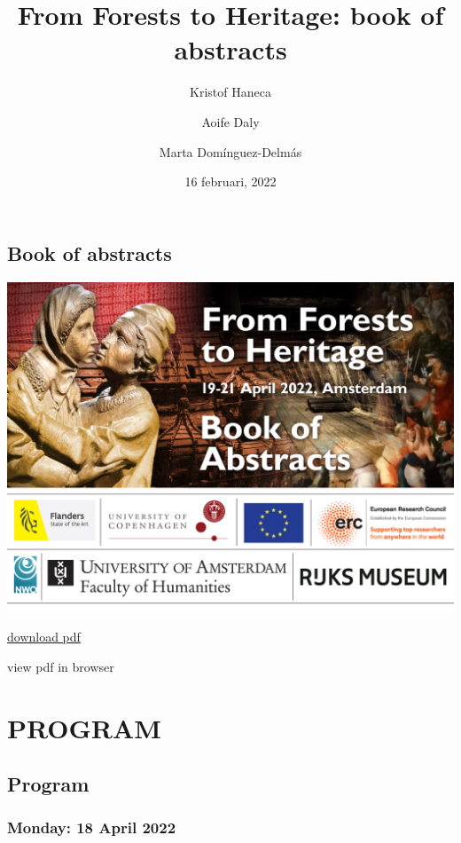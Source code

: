\documentclass[
]{book}
\title{From Forests to Heritage: book of abstracts}
\author{Kristof Haneca \and Aoife Daly \and Marta Domínguez-Delmás}
\date{16 februari, 2022}
\begin{document}
\maketitle

{
\setcounter{tocdepth}{1}
\tableofcontents
}
\hypertarget{book-of-abstracts}{%
\chapter*{Book of abstracts}\label{book-of-abstracts}}

\href{https://event.forests2heritage.nl/}{\includegraphics[width=1\textwidth,height=\textheight]{bookofAbstracts header.jpg}}

\href{https://github.com/hanecakr/forests2heritage/raw/main/docs/ForHer22_BOOKofABSTRACTS.pdf}{download pdf}

view pdf in browser

\hypertarget{part-program}{%
\part*{PROGRAM}\label{part-program}}

\hypertarget{program}{%
\chapter*{Program}\label{program}}

\hypertarget{monday-18-april-2022}{%
\section*{Monday: 18 April 2022}\label{monday-18-april-2022}}
\end{document}
